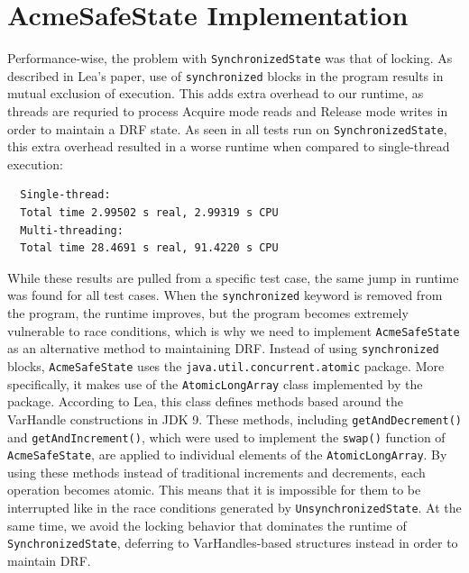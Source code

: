 \section{AcmeSafeState Implementation}

Performance-wise, the problem with \texttt{SynchronizedState} was that of locking.
As described in Lea's paper, use of \texttt{synchronized} blocks in the program
results in mutual exclusion of execution. This adds extra overhead to our runtime,
as threads are requried to process Acquire mode reads and Release mode writes in
order to maintain a DRF state. As seen in all tests run on \texttt{SynchronizedState},
this extra overhead resulted in a worse runtime when compared to single-thread
execution:

\begin{verbatim}
  Single-thread:
  Total time 2.99502 s real, 2.99319 s CPU
  Multi-threading:
  Total time 28.4691 s real, 91.4220 s CPU
\end{verbatim}

While these results are pulled from a specific test case, the same jump in runtime was
found for all test cases. When the \texttt{synchronized} keyword is removed from
the program, the runtime improves, but the program becomes extremely vulnerable to
race conditions, which is why we need to implement \texttt{AcmeSafeState} as an
alternative method to maintaining DRF. Instead of using \texttt{synchronized} blocks,
\texttt{AcmeSafeState} uses the \texttt{java.util.concurrent.atomic} package. More
specifically, it makes use of the \texttt{AtomicLongArray} class implemented by the
package. According to Lea, this class defines methods based around the VarHandle 
constructions in JDK 9. These methods, including \texttt{getAndDecrement()} and 
\texttt{getAndIncrement()}, which were used to implement the \texttt{swap()} function
of \texttt{AcmeSafeState}, are applied to individual elements of the 
\texttt{AtomicLongArray}. By using these methods instead of traditional increments
and decrements, each operation becomes atomic. This means that it is impossible for them
 to be interrupted like in the race conditions generated by
\texttt{UnsynchronizedState}. At the same time, we avoid the locking behavior that
dominates the runtime of \texttt{SynchronizedState}, deferring to VarHandles-based
structures instead in order to maintain DRF. 

